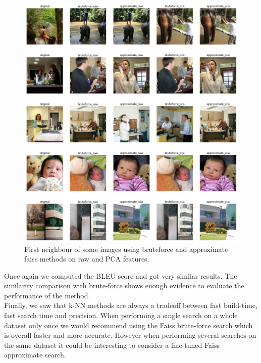 \documentclass[a4paper]{article}
\begin{document}
\begin{figure}[h]
	\includegraphics[width=\textwidth]{visual-faiss}
	\caption{First neighbour of some images using bruteforce and approximate faiss methods on raw and PCA features.}
	\label{fig:visual-faiss}
\end{figure}

Once again we computed the BLEU score and got very similar results. The similarity comparison with brute-force shows enough evidence to evaluate the performance of the method. \\

Finally, we saw that k-NN methods are always a tradeoff between fast build-time, fast search time and precision. When performing a single search on a whole dataset only once we would recommend using the Faiss brute-force search which is overall faster and more accurate. However when performing several searches on the same dataset it could be interesting to consider a fine-tuned Faiss approximate search.
\end{document}
